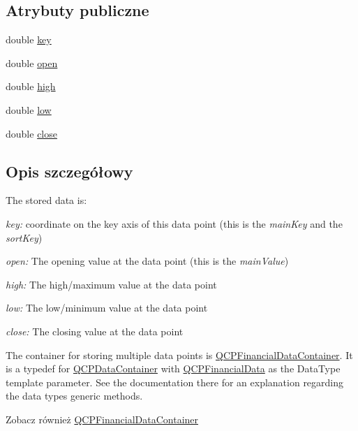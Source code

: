 \subsection*{Atrybuty publiczne}
\begin{DoxyCompactItemize}
\item 
double \hyperlink{class_q_c_p_financial_data_a18bc92126f28c214b05b0161e5f5958b}{key}
\item 
double \hyperlink{class_q_c_p_financial_data_a3059e1e1fbcb9fd243fde0450f238032}{open}
\item 
double \hyperlink{class_q_c_p_financial_data_a299a4b241296fb6cd1baf5ab03f7126a}{high}
\item 
double \hyperlink{class_q_c_p_financial_data_aecce0fb45a115e3f3a25eea78491ac16}{low}
\item 
double \hyperlink{class_q_c_p_financial_data_a45e9b96944c4a08ea6c82a72d3d22df2}{close}
\end{DoxyCompactItemize}


\subsection{Opis szczegółowy}
The stored data is\+: \begin{DoxyItemize}
\item {\itshape key\+:} coordinate on the key axis of this data point (this is the {\itshape main\+Key} and the {\itshape sort\+Key}) \item {\itshape open\+:} The opening value at the data point (this is the {\itshape main\+Value}) \item {\itshape high\+:} The high/maximum value at the data point \item {\itshape low\+:} The low/minimum value at the data point \item {\itshape close\+:} The closing value at the data point\end{DoxyItemize}
The container for storing multiple data points is \hyperlink{qcustomplot_8hh_ae36e482e04f19a54782f01ab38c354a6}{Q\+C\+P\+Financial\+Data\+Container}. It is a typedef for \hyperlink{class_q_c_p_data_container}{Q\+C\+P\+Data\+Container} with \hyperlink{class_q_c_p_financial_data}{Q\+C\+P\+Financial\+Data} as the Data\+Type template parameter. See the documentation there for an explanation regarding the data type\textquotesingle{}s generic methods.

\begin{DoxySeeAlso}{Zobacz również}
\hyperlink{qcustomplot_8hh_ae36e482e04f19a54782f01ab38c354a6}{Q\+C\+P\+Financial\+Data\+Container} 
\end{DoxySeeAlso}


